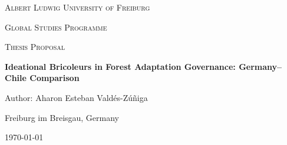 \begin{titlepage}
  \thispagestyle{empty}
  \centering

  {\LARGE \textsc{Albert Ludwig University of Freiburg}\par}
  \vspace{0.5em}
  {\Large \textsc{Global Studies Programme}\par}
  \vspace{0.25em}
  {\large \textsc{Thesis Proposal}\par}

  \vspace{3cm}
  {\huge\bfseries Ideational Bricoleurs in Forest Adaptation Governance: Germany--Chile Comparison \par}

  \vspace{2cm}
  {\Large Author: Aharon Esteban Valdés-Zúñiga\par}

  \vfill
  {\large Freiburg im Breisgau, Germany\par}
  {\large \today\par}
\end{titlepage}

